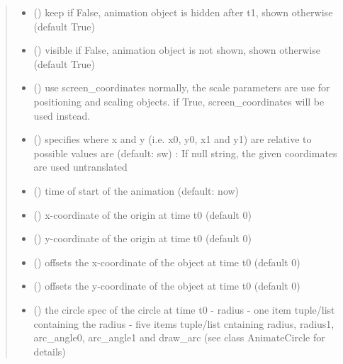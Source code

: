 \documentclass[letterpaper,10pt,english]{sphinxmanual}
\begin{document}
\begin{fulllineitems}
\begin{quote}
\begin{description}
\begin{itemize}
\item {} 
 () \textendash{} keep 
if False, animation object is hidden after t1, shown otherwise
(default True)

\item {} 
 () \textendash{} visible 
if False, animation object is not shown, shown otherwise
(default True)

\item {} 
 () \textendash{} use screen\_coordinates 
normally, the scale parameters are use for positioning and scaling
objects. 
if True, screen\_coordinates will be used instead.

\item {} 
 () \textendash{} specifies where x and y (i.e. x0, y0, x1 and y1) are relative to 
possible values are (default: sw) : 
If null string, the given coordimates are used untranslated

\item {} 
 () \textendash{} time of start of the animation (default: now)

\item {} 
 () \textendash{} x-coordinate of the origin at time t0 (default 0)

\item {} 
 () \textendash{} y-coordinate of the origin at time t0 (default 0)

\item {} 
 () \textendash{} offsets the x-coordinate of the object at time t0 (default 0)

\item {} 
 () \textendash{} offsets the y-coordinate of the object at time t0 (default 0)

\item {} 
 () \textendash{} the circle spec of the circle at time t0 
- radius 
- one item tuple/list containing the radius 
- five items tuple/list cntaining radius, radius1, arc\_angle0, arc\_angle1 and draw\_arc
(see class AnimateCircle for details)


\end{itemize}
\end{description}
\end{quote}
\end{fulllineitems}
\end{document}
